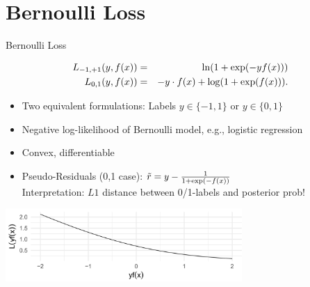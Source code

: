 \section{Bernoulli Loss}

\begin{vbframe}{Bernoulli Loss}

\vspace*{-0.5cm}
\begin{eqnarray*}
  L_{-1, +1}(y, f(x)) &=& \ln(1+\exp(-yf(x))) \\
  L_{0, 1}(y, f(x)) &=& - y \cdot f(x) + \log(1 + \exp(f(x))). 
\end{eqnarray*}

\begin{itemize}
  \item Two equivalent formulations: Labels $y \in \{-1, 1\}$ or $y \in \{0, 1\}$
  \item Negative log-likelihood of Bernoulli model, e.g., logistic regression
  \item Convex, differentiable
  \item Pseudo-Residuals (0,1 case): $\tilde{r} = y - \frac{1}{1+\exp(-f(x))}$\\   
    Interpretation: $L1$ distance between 0/1-labels and posterior prob!
\end{itemize}

\vspace{0.2cm}
\begin{center}
\includegraphics[width = 9cm ]{figure_man/bernoulli.png} \\
\end{center}

\end{vbframe}




